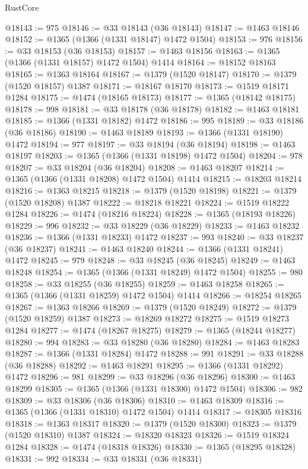 \begin{lexlean}{RustCore}
\begin{coremodule}
@18143 := 975
@18146 := @33 @18143 (@36 @18143)
@18147 := @1463 @18146
@18152 := @1365 (@1366 (@1331 @18147) @1472 @1504)
@18153 := 976
@18156 := @33 @18153 (@36 @18153)
@18157 := @1463 @18156
@18163 := @1365 (@1366 (@1331 @18157) @1472 @1504) @1414
@18164 := @18152 @18163
@18165 := @1363 @18164
@18167 := @1379 (@1520 @18147)
@18170 := @1379 (@1520 @18157) @1387
@18171 := @18167 @18170
@18173 := @1519 @18171 @1284
@18175 := @1474 (@18165 @18173)
@18177 := @1365 (@18142 @18175)
@18178 := 998
@18181 := @33 @18178 (@36 @18178)
@18182 := @1463 @18181
@18185 := @1366 (@1331 @18182) @1472
@18186 := 995
@18189 := @33 @18186 (@36 @18186)
@18190 := @1463 @18189
@18193 := @1366 (@1331 @18190) @1472
@18194 := 977
@18197 := @33 @18194 (@36 @18194)
@18198 := @1463 @18197
@18203 := @1365 (@1366 (@1331 @18198) @1472 @1504)
@18204 := 978
@18207 := @33 @18204 (@36 @18204)
@18208 := @1463 @18207
@18214 := @1365 (@1366 (@1331 @18208) @1472 @1504) @1414
@18215 := @18203 @18214
@18216 := @1363 @18215
@18218 := @1379 (@1520 @18198)
@18221 := @1379 (@1520 @18208) @1387
@18222 := @18218 @18221
@18224 := @1519 @18222 @1284
@18226 := @1474 (@18216 @18224)
@18228 := @1365 (@18193 @18226)
@18229 := 996
@18232 := @33 @18229 (@36 @18229)
@18233 := @1463 @18232
@18236 := @1366 (@1331 @18233) @1472
@18237 := 993
@18240 := @33 @18237 (@36 @18237)
@18241 := @1463 @18240
@18244 := @1366 (@1331 @18241) @1472
@18245 := 979
@18248 := @33 @18245 (@36 @18245)
@18249 := @1463 @18248
@18254 := @1365 (@1366 (@1331 @18249) @1472 @1504)
@18255 := 980
@18258 := @33 @18255 (@36 @18255)
@18259 := @1463 @18258
@18265 := @1365 (@1366 (@1331 @18259) @1472 @1504) @1414
@18266 := @18254 @18265
@18267 := @1363 @18266
@18269 := @1379 (@1520 @18249)
@18272 := @1379 (@1520 @18259) @1387
@18273 := @18269 @18272
@18275 := @1519 @18273 @1284
@18277 := @1474 (@18267 @18275)
@18279 := @1365 (@18244 @18277)
@18280 := 994
@18283 := @33 @18280 (@36 @18280)
@18284 := @1463 @18283
@18287 := @1366 (@1331 @18284) @1472
@18288 := 991
@18291 := @33 @18288 (@36 @18288)
@18292 := @1463 @18291
@18295 := @1366 (@1331 @18292) @1472
@18296 := 981
@18299 := @33 @18296 (@36 @18296)
@18300 := @1463 @18299
@18305 := @1365 (@1366 (@1331 @18300) @1472 @1504)
@18306 := 982
@18309 := @33 @18306 (@36 @18306)
@18310 := @1463 @18309
@18316 := @1365 (@1366 (@1331 @18310) @1472 @1504) @1414
@18317 := @18305 @18316
@18318 := @1363 @18317
@18320 := @1379 (@1520 @18300)
@18323 := @1379 (@1520 @18310) @1387
@18324 := @18320 @18323
@18326 := @1519 @18324 @1284
@18328 := @1474 (@18318 @18326)
@18330 := @1365 (@18295 @18328)
@18331 := 992
@18334 := @33 @18331 (@36 @18331)

\end{coremodule}
\end{lexlean}
